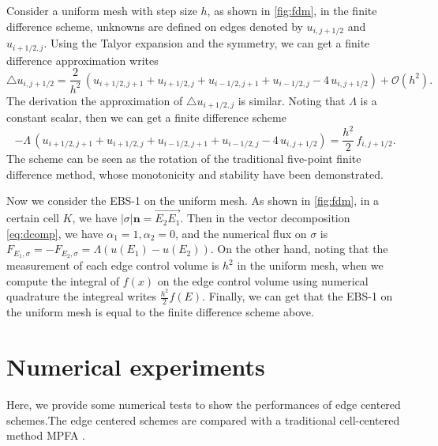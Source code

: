 \documentclass[times,review,preprint,authoryear]{elsarticle}
\newcommand{\bn}{\mathbf{n}}
\begin{document}
Consider a uniform mesh with step size $h$, as shown in \cref{fig:fdm}, in the finite difference scheme, unknowns are defined on edges denoted by $u_{i,j+1/2}$ and $u_{i+1/2,j}$. Using the Talyor expansion and the symmetry, we can get a finite difference approximation writes
\begin{equation*}
\triangle u_{i,j+1/2} = \frac{2}{h^2} \, (u_{i+1/2,j+1} + u_{i+1/2,j} + u_{i-1/2,j+1} + u_{i-1/2,j} - 4 \, u_{i,j+1/2} ) + \mathcal{O}(h^2).
\end{equation*}
The derivation the approximation of $\triangle u_{i+1/2,j}$ is similar. Noting that $\Lambda$ is a constant scalar, then we can get a finite difference scheme
\begin{equation}\label{eq:fdm}
-\Lambda \, (u_{i+1/2,j+1} + u_{i+1/2,j} + u_{i-1/2,j+1} + u_{i-1/2,j} - 4 \, u_{i,j+1/2}) = \frac{h^2}{2} \, f_{i,j+1/2}.
\end{equation}
The scheme can be seen as the rotation of the traditional five-point finite difference method, whose monotonicity and stability have been demonstrated.

Now we consider the EBS-1 on the uniform mesh. As shown in \cref{fig:fdm}, in a certain cell $K$, we have $|\sigma| \bn = \overrightarrow{E_2 E_1}$. Then in the vector decomposition \cref{eq:dcomp}, we have $\alpha_1 = 1, \alpha_2 = 0$, and the numerical flux on $\sigma$ is $F_{E_1, \sigma} = -F_{E_2, \sigma} = \Lambda (u(E_1) - u(E_2))$. On the other hand, noting that the measurement of each edge control volume is $h^2$ in the uniform mesh, when we compute the integral of $f(x)$ on the edge control volume using numerical quadrature the integreal writes $\frac{h^2}{2} f(E)$. Finally, we can get that the EBS-1 on the uniform mesh is equal to the finite difference scheme above.

\section{Numerical experiments}\label{sec5}

Here, we provide some numerical tests to show the performances of edge centered schemes.The edge centered schemes are compared with a traditional cell-centered method MPFA \cite{???}.
\end{document}
